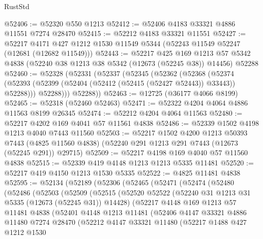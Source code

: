 \begin{lexlean}{RustStd}
\begin{coremodule}
{\begin{coremodule}
{{{{{{{{{{{{{{{{{{{{{{{{{{{{{{{{{{{{{{{{{{{{{{{{{{{{{{{{{{{{{{{{{{{{{{{{{{{{{{{{@52406 := @52320 @550 @1213
@52412 := @52406 @4183 @33321 @4886 @11551 @7274 @28470
@52415 := @52212 @4183 @33321 @11551
@52427 := @52217 @4171 @427 @1212 @1530 @11549 @5344 (@52243 @11549 @52247 (@12681 (@12682 @11549)))
@52443 := @52217
    @425
    @169
    @1213
    @57
    @5342
    @4838
    (@52240 @38 @1213 @38 @5342 (@12673 (@52245 @38)) @14456)
    @52288
@52460 := @52328
    (@52331
      (@52337
        (@52345
          (@52362
            (@52368
              (@52374 (@52393 (@52399 (@52404 (@52412 (@52415 (@52427 @52443)) @33443)) @52288)))
              @52288)))
        @52288))
@52463 := @12725 (@36177 @4066 @8199)
@52465 := @52318 (@52460 @52463)
@52471 := @52322 @4204 @4064 @4886 @11563 @8199 @26345
@52474 := @52212 @4204 @4064 @11563
@52480 := @52217 @4202 @169 @4041 @57 @11561 @4838
@52486 := @52339 @1502 @4198 @1213 @4040 @7443 @11560
@52503 := @52217
    @1502
    @4200
    @1213
    @50393
    @7443
    (@4825 @11560 @4838)
    (@52240 @291 @1213 @291 @7443 (@12673 (@52245 @291)) @29715)
@52509 := @52217 @4198 @169 @4040 @57 @11560 @4838
@52515 := @52339 @419 @4148 @1213 @1213 @5335 @11481
@52520 := @52217 @419 @4150 @1213 @1530 @5335
@52522 := @4825 @11481 @4838
@52595 := @52134
    (@52189
      (@52306
        (@52465
          (@52471
            (@52474
              (@52480
                (@52486
                  (@52503
                    (@52509
                      (@52515
                        (@52520
                          @52522
                          (@52240 @31 @1213 @31 @5335 (@12673 (@52245 @31)) @14428)
                          (@52217
                            @4148
                            @169
                            @1213
                            @57
                            @11481
                            @4838
                            (@52401
                              @4148
                              @1213
                              @11481
                              (@52406
                                @4147
                                @33321
                                @4886
                                @11480
                                @7274
                                @28470
                                (@52212
                                  @4147
                                  @33321
                                  @11480
                                  (@52217
                                    @1488
                                    @427
                                    @1212
                                    @1530
}}}}}}}}}}}}}}}}}}}}}}}}}}}}}}}}}}}}}}}}}}}}}}}}}}}}}}}}}}}}}}}}}}}}}}}}}}}}}}}}
\end{coremodule}}
\end{coremodule}
\end{lexlean}
